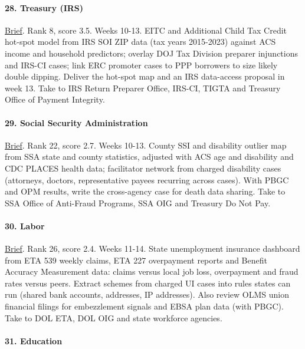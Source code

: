 \documentclass[letterpaper,11pt]{article}
\begin{document}
\hypertarget{treasury-irs}{%
\paragraph{28. Treasury (IRS)}\label{treasury-irs}}

\href{agencies/treasury.pdf}{Brief}. Rank 8, score 3.5. Weeks 10-13.
EITC and Additional Child Tax Credit hot-spot model from IRS SOI ZIP
data (tax years 2015-2023) against ACS income and household predictors;
overlay DOJ Tax Division preparer injunctions and IRS-CI cases; link ERC
promoter cases to PPP borrowers to size likely double dipping. Deliver
the hot-spot map and an IRS data-access proposal in week 13. Take to IRS
Return Preparer Office, IRS-CI, TIGTA and Treasury Office of Payment
Integrity.

\hypertarget{social-security-administration}{%
\paragraph{29. Social Security
Administration}\label{social-security-administration}}

\href{agencies/ssa.pdf}{Brief}. Rank 22, score 2.7. Weeks 10-13. County
SSI and disability outlier map from SSA state and county statistics,
adjusted with ACS age and disability and CDC PLACES health data;
facilitator network from charged disability cases (attorneys, doctors,
representative payees recurring across cases). With PBGC and OPM
results, write the cross-agency case for death data sharing. Take to SSA
Office of Anti-Fraud Programs, SSA OIG and Treasury Do Not Pay.

\hypertarget{labor}{%
\paragraph{30. Labor}\label{labor}}

\href{agencies/dol.pdf}{Brief}. Rank 26, score 2.4. Weeks 11-14. State
unemployment insurance dashboard from ETA 539 weekly claims, ETA 227
overpayment reports and Benefit Accuracy Measurement data: claims versus
local job loss, overpayment and fraud rates versus peers. Extract
schemes from charged UI cases into rules states can run (shared bank
accounts, addresses, IP addresses). Also review OLMS union financial
filings for embezzlement signals and EBSA plan data (with PBGC). Take to
DOL ETA, DOL OIG and state workforce agencies.

\hypertarget{education}{%
\paragraph{31. Education}\label{education}}
\end{document}
